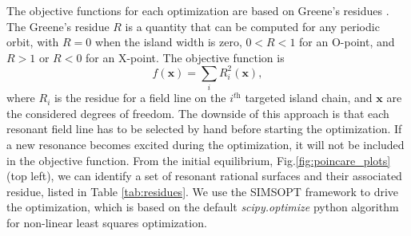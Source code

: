 \documentclass[my_thesis.tex]{subfiles}
\begin{document}
The objective functions for each optimization are based on Greene's residues \citep{Greene1978}. The Greene's residue $R$ is a quantity that can be computed for any periodic orbit, with $R=0$ when the island width is zero, $0< R< 1$ for an O-point, and $R>1$ or $R<0$ for an X-point. The objective function is
\begin{equation}
    f(\mathbf{x}) = \sum_i R_{i}^2(\mathbf{x}), \label{eq:objective_function_1}
\end{equation}
where $R_{i}$ is the residue for a field line on the  $i^{\textit{th}}$ targeted island chain, and $\mathbf{x}$ are the considered degrees of freedom. The downside of this approach is that each resonant field line has to be selected by hand before starting the optimization. If a new resonance becomes excited during the optimization, it will not be included in the objective function. From the initial equilibrium, Fig.\ref{fig:poincare_plots} (top left), we can identify a set of resonant rational surfaces and their associated residue, listed in Table \ref{tab:residues}. We use the SIMSOPT framework to drive the optimization, which is based on the default \emph{scipy.optimize} \citep{Virtanen2020} python algorithm for non-linear least squares optimization.
\end{document}

